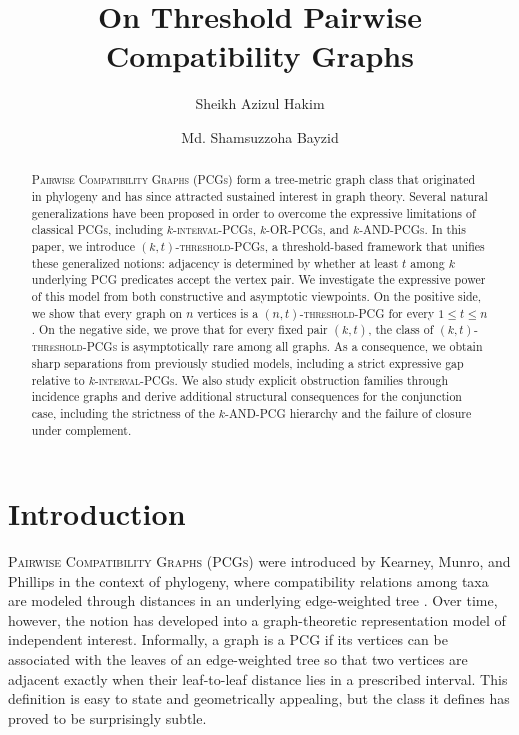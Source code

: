 \documentclass[a4paper,UKenglish,cleveref,autoref,thm-restate]{socg-lipics-v2021}
\title{On Threshold Pairwise Compatibility Graphs}
\author{Sheikh Azizul Hakim}
{Department of Computer Science and Engineering, Bangladesh University of Engineering and Technology, Dhaka, Bangladesh}
{hakim@cse.buet.ac.bd}
{https://orcid.org/0000-0002-3405-2402}
{}
\author{Md. Shamsuzzoha Bayzid}
{Department of Computer Science and Engineering, Bangladesh University of Engineering and Technology, Dhaka, Bangladesh}
{shams_bayzid@cse.buet.ac.bd}
{https://orcid.org/0000-0002-5640-0615}
{}
\begin{document}


\maketitle

\begin{abstract}
\textsc{Pairwise Compatibility Graphs} (\textsc{PCGs}) form a tree-metric graph class that originated in phylogeny and has since attracted sustained interest in graph theory. Several natural generalizations have been proposed in order to overcome the expressive limitations of classical \textsc{PCGs}, including \textsc{$k$-interval-\textsc{PCG}s}, \textsc{$k$-\textsc{OR}-\textsc{PCG}s}, and \textsc{$k$-\textsc{AND}-\textsc{PCG}s}. In this paper, we introduce \textsc{$(k,t)$-threshold-\textsc{PCG}s}, a threshold-based framework that unifies these generalized notions: adjacency is determined by whether at least $t$ among $k$ underlying \textsc{PCG} predicates accept the vertex pair. We investigate the expressive power of this model from both constructive and asymptotic viewpoints. On the positive side, we show that every graph on $n$ vertices is a \textsc{$(n,t)$-threshold-\textsc{PCG}} for every $1 \le t \le n$. On the negative side, we prove that for every fixed pair $(k,t)$, the class of \textsc{$(k,t)$-threshold-\textsc{PCG}s} is asymptotically rare among all graphs. As a consequence, we obtain sharp separations from previously studied models, including a strict expressive gap relative to \textsc{$k$-interval-\textsc{PCG}s}. We also study explicit obstruction families through incidence graphs and derive additional structural consequences for the conjunction case, including the strictness of the \textsc{$k$-\textsc{AND}-\textsc{PCG}} hierarchy and the failure of closure under complement.
\end{abstract}

\section{Introduction}

\textsc{Pairwise Compatibility Graphs} (\textsc{PCGs}) were introduced by Kearney, Munro, and Phillips in the context of phylogeny, where compatibility relations among taxa are modeled through distances in an underlying edge-weighted tree \cite{Kearney2003EfficientGOU}. Over time, however, the notion has developed into a graph-theoretic representation model of independent interest. Informally, a graph is a \textsc{PCG} if its vertices can be associated with the leaves of an edge-weighted tree so that two vertices are adjacent exactly when their leaf-to-leaf distance lies in a prescribed interval. This definition is easy to state and geometrically appealing, but the class it defines has proved to be surprisingly subtle.
\end{document}
